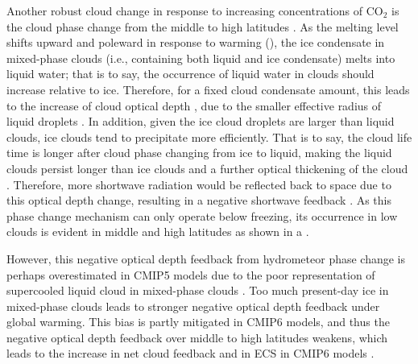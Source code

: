 Another robust cloud change in response to increasing concentrations of CO$_2$ is the cloud phase change from the middle to high latitudes \citep[e.g.,][]{Storelvmo2015cloud,Ceppi2016mechanisms,Tan2016observational,McCoy2016relationships}. As the melting level shifts upward and poleward in response to warming (), the ice condensate in mixed-phase clouds (i.e., containing both liquid and ice condensate) melts into liquid water; that is to say, the occurrence of liquid water in clouds should increase relative to ice. Therefore, for a fixed cloud condensate amount, this leads to the increase of cloud optical depth \citep{Stephens1978radiation}, due to the smaller effective radius of liquid droplets \citep{Stubenrauch2013}. In addition, given the ice cloud droplets are larger than liquid clouds, ice clouds tend to precipitate more efficiently. That is to say, the cloud life time is longer after cloud phase changing from ice to liquid, making the liquid clouds persist longer than ice clouds and a further optical thickening of the cloud \citep{Storelvmo2015cloud,Ceppi2016mechanisms}. Therefore, more shortwave radiation would be reflected back to space due to this optical depth change, resulting in a negative shortwave feedback \citep[e.g.,][]{Zelinka2012computing1,Zelinka2012computing2,Zelinka2013contributions,Ceppi2016mechanisms,Tan2016observational,McCoy2016relationships,Zelinka2020causes}. As this phase change mechanism can only operate below freezing, its occurrence in low clouds is evident in middle and high latitudes as shown in a \citep{Ceppi2017}. 


However, this negative optical depth feedback from hydrometeor phase change is perhaps overestimated in CMIP5 models due to the poor representation of supercooled liquid cloud in mixed-phase clouds \citep{Tan2016observational,Frey2018influence}. Too much present-day ice in mixed-phase clouds leads to stronger negative optical depth feedback under global warming. This bias is partly mitigated in CMIP6 models, and thus the negative optical depth feedback over middle to high latitudes weakens, which leads to the increase in net cloud feedback and in ECS in CMIP6 models \citep{Zelinka2020causes}.


